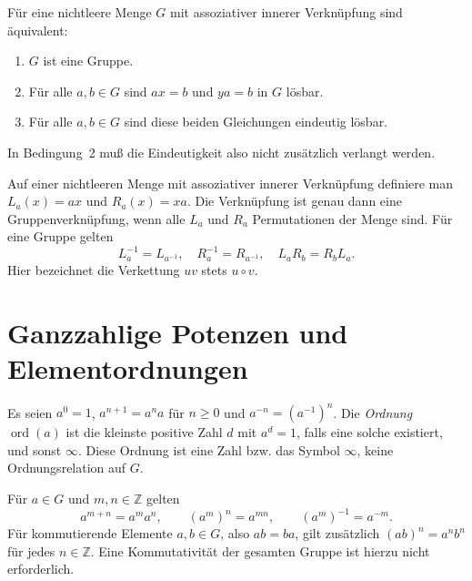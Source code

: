 \begin{theorem}
\label{b40guide:thm:division}
Für eine nichtleere Menge \(G\) mit assoziativer innerer Verknüpfung
sind äquivalent:
\begin{enumerate}
\item \(G\) ist eine Gruppe.
\item Für alle \(a,b\in G\) sind \(ax=b\) und \(ya=b\) in \(G\) lösbar.
\item Für alle \(a,b\in G\) sind diese beiden Gleichungen eindeutig lösbar.
\end{enumerate}
In Bedingung~2 muß die Eindeutigkeit also nicht zusätzlich verlangt werden.
\cite{une}
\end{theorem}

\begin{theorem}[Translationscharakterisierung]
Auf einer nichtleeren Menge mit assoziativer innerer Verknüpfung
definiere man \(L_a(x)=ax\) und \(R_a(x)=xa\).
Die Verknüpfung ist genau dann eine Gruppenverknüpfung, wenn alle
\(L_a\) und \(R_a\) Permutationen der Menge sind.
Für eine Gruppe gelten
\[
 L_a^{-1}=L_{a^{-1}},\quad R_a^{-1}=R_{a^{-1}},
 \quad L_aR_b=R_bL_a.
\]
Hier bezeichnet die Verkettung \(uv\) stets \(u\circ v\).
\cite{milne}
\end{theorem}

\section{Ganzzahlige Potenzen und Elementordnungen}

\begin{definition}
Es seien \(a^0=1\), \(a^{n+1}=a^na\) für \(n\geq0\) und
\(a^{-n}=(a^{-1})^n\). Die \emph{Ordnung} \(\operatorname{ord}(a)\)
ist die kleinste positive Zahl \(d\) mit \(a^d=1\), falls eine solche
existiert, und sonst \(\infty\). Diese Ordnung ist eine Zahl bzw. das
Symbol \(\infty\), keine Ordnungsrelation auf \(G\).
\end{definition}

\begin{theorem}
Für \(a\in G\) und \(m,n\in\mathbb Z\) gelten
\[
 a^{m+n}=a^ma^n,\qquad (a^m)^n=a^{mn},\qquad
 (a^m)^{-1}=a^{-m}.
\]
Für kommutierende Elemente \(a,b\in G\), also \(ab=ba\), gilt zusätzlich
\((ab)^n=a^nb^n\) für jedes \(n\in\mathbb Z\).
Eine Kommutativität der gesamten Gruppe ist hierzu nicht erforderlich.
\cite{milne}
\end{theorem}

